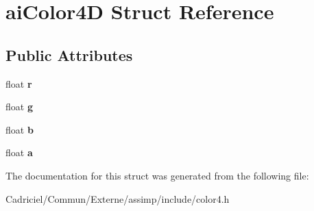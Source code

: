 \hypertarget{structai_color4_d}{}\section{ai\+Color4D Struct Reference}
\label{structai_color4_d}
\subsection*{Public Attributes}
\begin{DoxyCompactItemize}
\item 
float {\bfseries r}\hypertarget{structai_color4_d_a989c2117cfae5a4457fa65f0257e93c7}{}\label{structai_color4_d_a989c2117cfae5a4457fa65f0257e93c7}

\item 
float {\bfseries g}\hypertarget{structai_color4_d_a32e929c7db12fb6f79f74a611f6d8fe6}{}\label{structai_color4_d_a32e929c7db12fb6f79f74a611f6d8fe6}

\item 
float {\bfseries b}\hypertarget{structai_color4_d_ab64376fc730371f8952f5f98084b2430}{}\label{structai_color4_d_ab64376fc730371f8952f5f98084b2430}

\item 
float {\bfseries a}\hypertarget{structai_color4_d_a1bf4f719c14e844dcd7ce5a1c1969c89}{}\label{structai_color4_d_a1bf4f719c14e844dcd7ce5a1c1969c89}

\end{DoxyCompactItemize}


The documentation for this struct was generated from the following file\+:\begin{DoxyCompactItemize}
\item 
Cadriciel/\+Commun/\+Externe/assimp/include/color4.\+h\end{DoxyCompactItemize}
